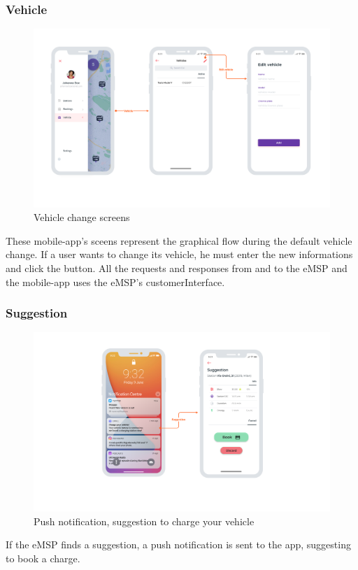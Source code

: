 \subsubsection{Vehicle}
\begin{center}
    \begin{figure}[H]
        \includegraphics[width=\textwidth]{./img/design/app/Vehicles.png}
        \caption{Vehicle change screens}
    \end{figure}
\end{center}
These mobile-app's sceens represent the graphical flow during the default vehicle change. If a user wants to change its vehicle, he must enter the new informations and click the button. All the requests and responses from and to the eMSP and the mobile-app uses the eMSP's customerInterface.

\subsubsection{Suggestion}
\begin{center}
    \begin{figure}[H]
        \includegraphics[width=\textwidth]{./img/design/app/Suggestion.png}
        \caption{Push notification, suggestion to charge your vehicle}
    \end{figure}
\end{center}
If the eMSP finds a suggestion, a push notification is sent to the app, suggesting to book a charge.



